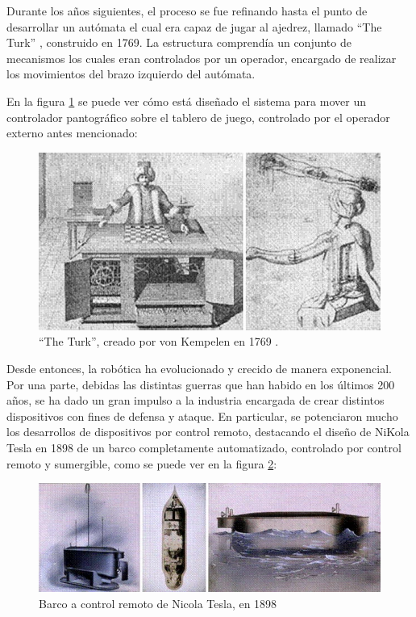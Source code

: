 Durante los años siguientes, el proceso se fue refinando hasta el punto de desarrollar un autómata
el cual era capaz de jugar al ajedrez, llamado ``The Turk'' \cite{standage_tom_turk_2002}, construido
en 1769. La estructura comprendía un conjunto de mecanismos los cuales eran controlados por un operador,
encargado de realizar los movimientos del brazo izquierdo del autómata.

En la figura \ref{fig:turk} se puede ver cómo está diseñado el sistema para mover un controlador 
pantográfico sobre el tablero de juego, controlado por el operador externo antes mencionado:

\begin{figure}[H]
    \centering
    \includegraphics[width=.75\linewidth]{pictures/chess_evolution.png}
    \caption{``The Turk'', creado por von Kempelen en 1769 \cite{standagetomTurkLifeTimes2002a}.}
    \label{fig:turk}
\end{figure}

Desde entonces, la robótica ha evolucionado y crecido de manera exponencial. Por una parte, debidas
las distintas guerras que han habido en los últimos 200 años, se ha dado un gran impulso a la 
industria encargada de crear distintos dispositivos con fines de defensa y ataque. En particular,
se potenciaron mucho los desarrollos de dispositivos por control remoto, destacando el diseño de
NiKola Tesla en 1898 de un barco completamente automatizado, controlado por control remoto y sumergible,
como se puede ver en la figura \ref{fig:nicola_tesla_boat}:

\begin{figure}[H]
    \centering
    \includegraphics[width=.75\linewidth]{pictures/nicola_tesla_boat.png}
    \caption{Barco a control remoto de Nicola Tesla, en 1898 \cite{belarminojandmoranmeandfiroozifandcapellosandkolioseandperrottimTeslaRobotDawn2005a}}
    \label{fig:nicola_tesla_boat}
\end{figure}

